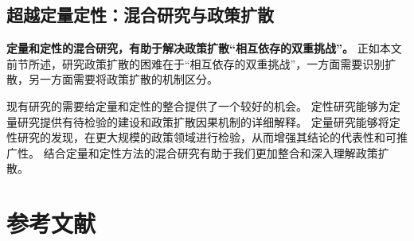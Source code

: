\documentclass[
  12pt,
]{ctexart}
\begin{document}
\hypertarget{ux8d85ux8d8aux5b9aux91cfux5b9aux6027ux6df7ux5408ux7814ux7a76ux4e0eux653fux7b56ux6269ux6563}{%
\subsection{超越定量定性：混合研究与政策扩散}\label{ux8d85ux8d8aux5b9aux91cfux5b9aux6027ux6df7ux5408ux7814ux7a76ux4e0eux653fux7b56ux6269ux6563}}

\textbf{定量和定性的混合研究，有助于解决政策扩散``相互依存的双重挑战''。}
正如本文前节所述，研究政策扩散的困难在于``相互依存的双重挑战''，一方面需要识别扩散，另一方面需要将政策扩散的机制区分。

现有研究的需要给定量和定性的整合提供了一个较好的机会。
定性研究能够为定量研究提供有待检验的建设和政策扩散因果机制的详细解释。
定量研究能够将定性研究的发现，在更大规模的政策领域进行检验，从而增强其结论的代表性和可推广性。
结合定量和定性方法的混合研究有助于我们更加整合和深入理解政策扩散。

\newpage

\hypertarget{ux53c2ux8003ux6587ux732e}{%
\section{参考文献}\label{ux53c2ux8003ux6587ux732e}}
\end{document}
